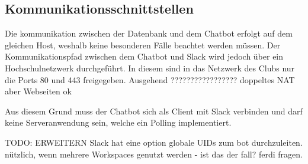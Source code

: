 \subsection{Kommunikationsschnittstellen}

Die kommunikation zwischen der Datenbank und dem Chatbot erfolgt auf dem gleichen Host, weshalb keine besonderen Fälle beachtet werden müssen. Der Kommunikationspfad zwischen dem Chatbot und Slack wird jedoch über ein Hochschulnetzwerk durchgeführt. In diesem sind in das Netzwerk des Clubs nur die Ports 80 und 443 freigegeben. Ausgehend ????????????????? doppeltes NAT aber Webseiten ok

Aus diesem Grund muss der Chatbot sich als Client mit Slack verbinden und darf keine Serveranwendung sein, welche ein Polling implementiert.



TODO: ERWEITERN
Slack hat eine option globale UIDs zum bot durchzuleiten. nützlich, wenn mehrere Workspaces genutzt werden - ist das der fall? ferdi fragen.
